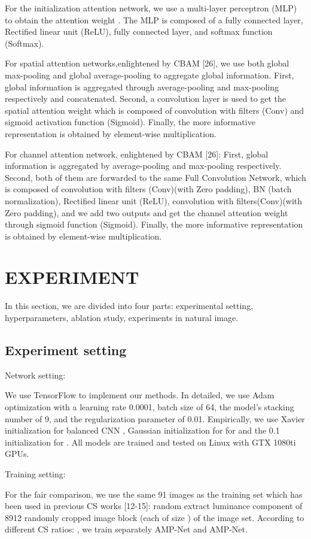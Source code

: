 \documentclass[conference]{IEEEtran}
\begin{document}
For the initialization attention network, we use a multi-layer perceptron (MLP)  to obtain the attention weight . The MLP is composed of a fully connected layer, Rectified linear unit (ReLU), fully connected layer, and softmax function (Softmax). 

For spatial attention networks,enlightened by CBAM [26], we use both global max-pooling and global average-pooling to aggregate global information. First, global information is aggregated through average-pooling and max-pooling respectively and concatenated. Second, a convolution layer is used to get the spatial attention weight   which is composed of convolution with  filters (Conv) and sigmoid activation function (Sigmoid). Finally, the more informative representation is obtained by element-wise multiplication. 

For channel attention network, enlightened by CBAM [26]: First, global information is aggregated by average-pooling and max-pooling respectively. Second, both of them are forwarded to the same Full Convolution Network, which is composed of convolution with  filters (Conv)(with Zero padding), BN (batch normalization), Rectified linear unit (ReLU), convolution with  filters(Conv)(with Zero padding), and we add two outputs and  get the channel attention weight  through sigmoid function (Sigmoid). Finally, the more informative representation is obtained by element-wise multiplication.

\section{ EXPERIMENT}
In this section, we are divided into four parts: experimental setting, hyperparameters, ablation study, experiments in natural image.
\subsection{ Experiment setting}
\begin{bfseries} 
Network setting:
\end{bfseries}
 We use TensorFlow to implement our methods. In detailed, we use Adam optimization with a learning rate 0.0001, batch size of 64, the model's stacking number of 9, and the regularization parameter  of 0.01. Empirically, we use Xavier initialization for balanced CNN  , Gaussian initialization for for   and the 0.1 initialization for . All models are trained and tested on Linux with GTX 1080ti GPUs.
 
\begin{bfseries} 
Training setting:
\end{bfseries} 
 For the fair comparison, we use the same 91 images as the training set which has been used in previous CS works [12-15]:  random extract luminance component of 8912 randomly cropped image block (each of size ) of the image set. According to different CS ratios: , we train separately AMP-Net and AMP-Net.
\end{document}
